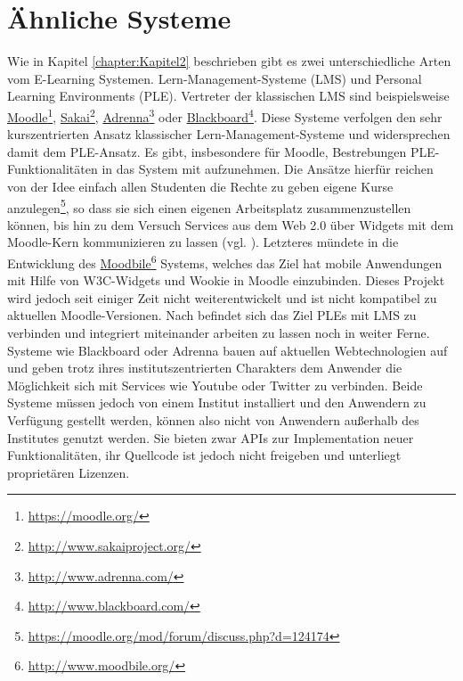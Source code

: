 \section{Ähnliche Systeme}\label{section:aehnliche_systeme}
Wie in Kapitel \ref{chapter:Kapitel2} beschrieben gibt es zwei unterschiedliche Arten vom E-Learning Systemen. Lern-Management-Systeme (LMS) und Personal Learning Environments (PLE). Vertreter der klassischen LMS sind beispielsweise \href{https://moodle.org/}{Moodle}\footnote{\url{https://moodle.org/}}, \href{http://www.sakaiproject.org/}{Sakai}\footnote{\url{http://www.sakaiproject.org/}}, \href{http://www.adrenna.com/}{Adrenna}\footnote{\url{http://www.adrenna.com/}} oder \href{http://www.blackboard.com/}{Blackboard}\footnote{\url{http://www.blackboard.com/}}. Diese Systeme verfolgen den sehr kurszentrierten Ansatz klassischer Lern-Management-Systeme und widersprechen damit dem PLE-Ansatz. Es gibt, insbesondere für Moodle, Bestrebungen PLE-Funktionalitäten in das System mit aufzunehmen. Die Ansätze hierfür reichen von der Idee einfach allen Studenten die Rechte zu geben eigene Kurse anzulegen\footnote{\url{https://moodle.org/mod/forum/discuss.php?d=124174}}, so dass sie sich einen eigenen Arbeitsplatz zusammenzustellen können, bis hin zu dem Versuch Services aus dem Web 2.0 über Widgets mit dem Moodle-Kern kommunizieren zu lassen (vgl. \cite{Penalvo2011}). Letzteres mündete in die Entwicklung des \href{http://www.moodbile.org/}{Moodbile}\footnote{\url{http://www.moodbile.org/}} Systems, welches das Ziel hat mobile Anwendungen mit Hilfe von W3C-Widgets und Wookie in Moodle einzubinden. Dieses Projekt wird jedoch seit einiger Zeit nicht weiterentwickelt und ist nicht kompatibel zu aktuellen Moodle-Versionen. Nach \cite{Penalvo2011} befindet sich das Ziel PLEs mit LMS zu verbinden und integriert miteinander arbeiten zu lassen noch in weiter Ferne. Systeme wie Blackboard oder Adrenna bauen auf aktuellen Webtechnologien auf und geben trotz ihres institutszentrierten Charakters dem Anwender die Möglichkeit sich mit Services wie Youtube oder Twitter zu verbinden. Beide Systeme müssen jedoch von einem Institut installiert und den Anwendern zu Verfügung gestellt werden, können also nicht von Anwendern außerhalb des Institutes genutzt werden. Sie bieten zwar APIs zur Implementation neuer Funktionalitäten, ihr Quellcode ist jedoch nicht freigeben und unterliegt proprietären Lizenzen.

